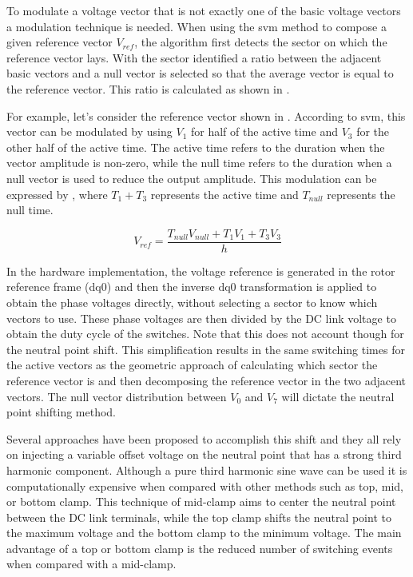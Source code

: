 To modulate a voltage vector that is not exactly one of the basic voltage vectors a modulation technique is needed. When using the \gls{svm} method to compose a given reference vector $V_{ref}$, the algorithm first detects the sector on which the reference vector lays. With the sector identified a ratio between the adjacent basic vectors and a null vector is selected so that the average vector is equal to the reference vector. This ratio is calculated as shown in .

For example, let's consider the reference vector shown in . According to \gls{svm}, this vector can be modulated by using $V_1$ for half of the active time and $V_3$ for the other half of the active time. The active time refers to the duration when the vector amplitude is non-zero, while the null time refers to the duration when a null vector is used to reduce the output amplitude. This modulation can be expressed by , where $T_1+T_3$ represents the active time and $T_{null}$ represents the null time.

\begin{equation}
	V_{ref} = \frac{T_{null} V_{null} + T_1 V_1  + T_3 V_3}{h}
	\label{eq:svm_vref}
\end{equation}



In the hardware implementation, the voltage reference is generated in the rotor reference frame (dq0) and then the inverse dq0 transformation is applied to obtain the phase voltages directly, without selecting a sector to know which vectors to use. These phase voltages are then divided by the DC link voltage to obtain the duty cycle of the switches. Note that this does not account though for the neutral point shift. This simplification results in the same switching times for the active vectors as the geometric approach of calculating which sector the reference vector is and then decomposing the reference vector in the two adjacent vectors. The null vector distribution between $V_0$ and $V_7$ will dictate the neutral point shifting method. 

Several approaches have been proposed to accomplish this shift and they all rely on injecting a variable offset voltage on the neutral point that has a strong third harmonic component. Although a pure third harmonic sine wave can be used it is computationally expensive when compared with other methods such as top, mid, or bottom clamp. This technique of mid-clamp aims to center the neutral point between the DC link terminals, while the top clamp shifts the neutral point to the maximum voltage and the bottom clamp to the minimum voltage. The main advantage of a top or bottom clamp is the reduced number of switching events when compared with a mid-clamp. 

